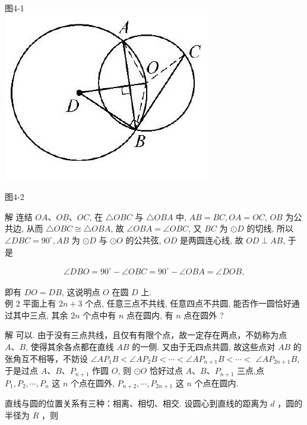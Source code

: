 \documentclass[10pt]{article}
\begin{document}
图4-1\\
\includegraphics[max width=\textwidth, center]{2024_10_30_66b8e5e701da2093c133g-029}

图4-2

解 连结 $O A 、 O B 、 O C$, 在 $\triangle O B C$ 与 $\triangle O B A$ 中, $A B=B C, O A=O C$, $O B$ 为公共边, 从而 $\triangle O B C \cong \triangle O B A$, 故 $\angle O B A=\angle O B C$, 又 $B C$ 为 $\odot D$ 的切线, 所以 $\angle D B C=90^{\circ}, A B$ 为 $\odot D$ 与 $\odot O$ 的公共弦, $O D$ 是两圆连心线, 故 $O D \perp A B$, 于是

\begin{align*}
\angle D B O=90^{\circ}-\angle O B C=90^{\circ}-\angle O B A=\angle D O B,
\end{align*}

即有 $D O=D B$, 这说明点 $O$ 在圆 $D$ 上.\\
例 2 平面上有 $2 n+3$ 个点, 任意三点不共线, 任意四点不共圆, 能否作一圆恰好通过其中三点, 其余 $2 n$ 个点中有 $n$ 点在圆内, 有 $n$ 点在圆外 ?

解 可以. 由于没有三点共线，且仅有有限个点，故一定存在两点，不妨称为点 $A 、 B$, 使得其余各点都在直线 $A B$ 的一侧. 又由于无四点共圆, 故这些点对 $A B$ 的张角互不相等，不妨设 $\angle A P_{1} B<\angle A P_{2} B<\cdots<\angle A P_{n+1} B<\cdots<$ $\angle A P_{2 n+1} B$, 于是过点 $A 、 B 、 P_{n+1}$ 作圆 $O$, 则 $\odot O$ 恰好过点 $A 、 B 、 P_{n+1}$ 三点,点 $P_{1}, P_{2}, \cdots, P_{n}$ 这 $n$ 个点在圆外, $P_{n+2}, \cdots, P_{2 n+1}$ 这 $n$ 个点在圆内.

直线与圆的位置关系有三种：相离、相切、相交. 设圆心到直线的距离为 $d$ ，圆的半径为 $R$ ，则
\end{document}
